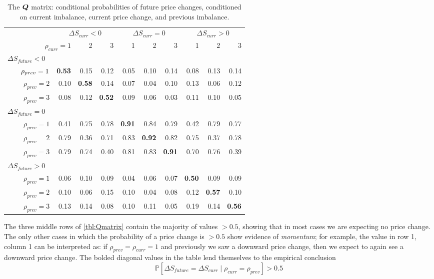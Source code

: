\begin{table}
\centering
{}
\begin{tabular}{@{} r@{\hskip 1cm} *{9}{r} @{}}
\toprule
& \multicolumn{3}{c}{$\Delta S_{curr} < 0$} & \multicolumn{3}{c}{$\Delta S_{curr} = 0$} & \multicolumn{3}{c}{$\Delta S_{curr} > 0$} \\
\cmidrule(lr){2-4} \cmidrule(lr){5-7} \cmidrule(lr){8-10}
\multicolumn{2}{r}{$\rho_{curr} = 1$} & 2 & 3 & 1 & 2 & 3 & 1 & 2 & 3 \\
\midrule
\multicolumn{10}{l}{$\Delta S_{future} < 0$} \\
$\hphantom{abcd}\rho_{prev} = 1$ & \bf 0.53 & 0.15 & 0.12 & 0.05 & 0.10 & 0.14 & 0.08 & 0.13 & 0.14 \\
$\rho_{prev} = 2$ & 0.10 & \bf 0.58 & 0.14 & 0.07 & 0.04 & 0.10 & 0.13 & 0.06 & 0.12 \\
$\rho_{prev} = 3$ & 0.08 & 0.12 & \bf 0.52 & 0.09 & 0.06 & 0.03 & 0.11 & 0.10 & 0.05 \\[0.6ex]
\multicolumn{10}{l}{$\Delta S_{future} = 0$} \\
$\rho_{prev} = 1$ & 0.41 & 0.75 & 0.78 & \bf 0.91 & 0.84 & 0.79 & 0.42 & 0.79 & 0.77 \\
$\rho_{prev} = 2$ & 0.79 & 0.36 & 0.71 & 0.83 & \bf 0.92 & 0.82 & 0.75 & 0.37 & 0.78 \\
$\rho_{prev} = 3$ & 0.79 & 0.74 & 0.40 & 0.81 & 0.83 & \bf 0.91 & 0.70 & 0.76 & 0.39 \\[0.6ex]
\multicolumn{10}{l}{$\Delta S_{future} > 0$} \\
$\rho_{prev} = 1$ & 0.06 & 0.10 & 0.09 & 0.04 & 0.06 & 0.07 & \bf 0.50 & 0.09 & 0.09 \\
$\rho_{prev} = 2$ & 0.10 & 0.06 & 0.15 & 0.10 & 0.04 & 0.08 & 0.12 & \bf 0.57 & 0.10 \\
$\rho_{prev} = 3$ & 0.13 & 0.14 & 0.08 & 0.10 & 0.11 & 0.05 & 0.19 & 0.14 & \bf 0.56 \\
\bottomrule
\end{tabular}
\caption[Probabilities of future price changes]{The $\boldsymbol{Q}$ matrix: conditional probabilities of future price changes, conditioned on current imbalance, current price change, and previous imbalance.}
\label{tbl:Qmatrix}
\end{table}

The three middle rows of \autoref{tbl:Qmatrix} contain the majority of values $>0.5$, showing that in most cases we are expecting no price change. The only other cases in which the probability of a price change is $>0.5$ show evidence of \textit{momentum}; for example, the value in row 1, column 1 can be interpreted as: if $\rho_{prev} = \rho_{curr} = 1$ and previously we saw a downward price change, then we expect to again see a downward price change. The bolded diagonal values in the table lend themselves to the empirical conclusion
\begin{equation}\label{eq:EDAKeyInsight}
\mathbb{P} \left[ \Delta S_{future} = \Delta S_{curr} \; | \; \rho_{curr} = \rho_{prev} \right] > 0.5
\end{equation}

